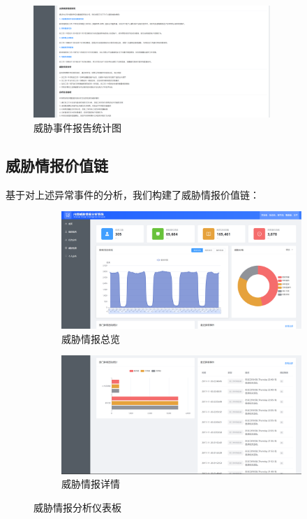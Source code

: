 \documentclass[UTF8,12pt]{ctexart}
\begin{document}
\begin{figure}[H]
    \centering
    \includegraphics[width=0.8\textwidth]{threat_report.png}
    \caption{威胁事件报告统计图}
    \label{fig:threat_report}
\end{figure}

\subsection{威胁情报价值链}
基于对上述异常事件的分析，我们构建了威胁情报价值链：

\begin{figure}[H]
    \centering
    \begin{subfigure}{0.48\textwidth}
        \includegraphics[width=\textwidth]{home.png}
        \caption{威胁情报总览}
        \label{fig:home_overview}
    \end{subfigure}
    \begin{subfigure}{0.48\textwidth}
        \includegraphics[width=\textwidth]{home_threat.png}
        \caption{威胁情报详情}
        \label{fig:home_threat}
    \end{subfigure}
    \caption{威胁情报分析仪表板}
    \label{fig:threat_dashboard}
\end{figure}
\end{document}
